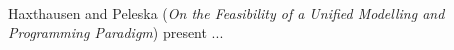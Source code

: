 

\ \hline \ %

Haxthausen and Peleska
\cite{isola-2016-haxthausen}
({\em On the Feasibility of a Unified Modelling and
Programming Paradigm})
present ...
